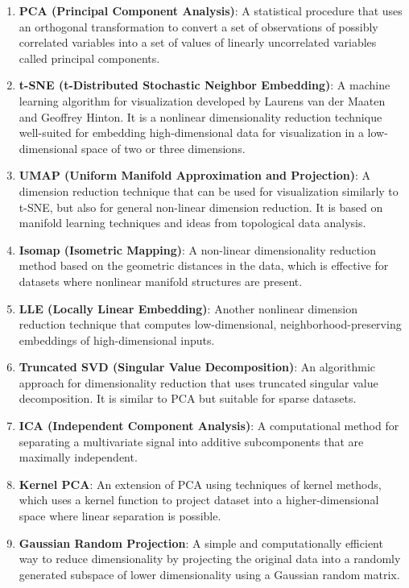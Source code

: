 \begin{enumerate}
    \item \textbf{PCA (Principal Component Analysis)}: A statistical procedure that uses an orthogonal transformation to convert a set of observations of possibly correlated variables into a set of values of linearly uncorrelated variables called principal components.

    \item \textbf{t-SNE (t-Distributed Stochastic Neighbor Embedding)}: A machine learning algorithm for visualization developed by Laurens van der Maaten and Geoffrey Hinton. It is a nonlinear dimensionality reduction technique well-suited for embedding high-dimensional data for visualization in a low-dimensional space of two or three dimensions.

    \item \textbf{UMAP (Uniform Manifold Approximation and Projection)}: A dimension reduction technique that can be used for visualization similarly to t-SNE, but also for general non-linear dimension reduction. It is based on manifold learning techniques and ideas from topological data analysis.

    \item \textbf{Isomap (Isometric Mapping)}: A non-linear dimensionality reduction method based on the geometric distances in the data, which is effective for datasets where nonlinear manifold structures are present.

    \item \textbf{LLE (Locally Linear Embedding)}: Another nonlinear dimension reduction technique that computes low-dimensional, neighborhood-preserving embeddings of high-dimensional inputs.

    \item \textbf{Truncated SVD (Singular Value Decomposition)}: An algorithmic approach for dimensionality reduction that uses truncated singular value decomposition. It is similar to PCA but suitable for sparse datasets.

    \item \textbf{ICA (Independent Component Analysis)}: A computational method for separating a multivariate signal into additive subcomponents that are maximally independent.

    \item \textbf{Kernel PCA}: An extension of PCA using techniques of kernel methods, which uses a kernel function to project dataset into a higher-dimensional space where linear separation is possible.

    \item \textbf{Gaussian Random Projection}: A simple and computationally efficient way to reduce dimensionality by projecting the original data into a randomly generated subspace of lower dimensionality using a Gaussian random matrix.
\end{enumerate}